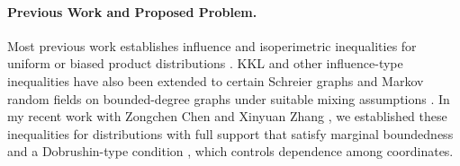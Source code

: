 \paragraph{Previous Work and Proposed Problem.}

Most previous work establishes influence and isoperimetric inequalities for uniform or biased product distributions \cite{Talagrand93,KKL88,CorderoErausquinLedoux12}.
KKL and other influence-type inequalities have also been extended to certain Schreier graphs \cite{ODonnellWimmer13} and Markov random fields on bounded-degree graphs under suitable mixing assumptions \cite{KoehlerLifshitzMinzerMossel23}. 
In my recent work with Zongchen Chen and Xinyuan Zhang \cite{chen2026discrete}, we established these inequalities for distributions with full support that satisfy marginal boundedness and a Dobrushin-type condition \cite{Dobrushin68}, which controls dependence among coordinates.


